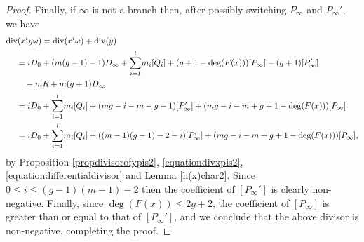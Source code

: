 \begin{proof}
    Finally, if $\infty$ is not a branch then, after possibly switching $P_\infty$ and $P_\infty'$, we have
        \begin{align*}
        \di(x^iy\omega) &  = \di (x^i\omega) + \di(y) \\
        & \hspace{-3em} = iD_0 + (m(g-1)-1)D_\infty + {\displaystyle \sum_{i=1}^l} m_i[Q_i] + (g+1-\deg(F(x)))[P_\infty] - (g+1)[P_\infty'] \\
        & \hspace{-2em} - mR + m(g+1)D_\infty \\
        & \hspace{-3em} =  iD_0 + {\displaystyle \sum_{i=1}^l} m_i[Q_i] + (mg - i - m - g - 1)[P_\infty'] + (mg - i - m + g + 1 - \deg(F(x)))[P_\infty] \\
        & \hspace{-3em} =  iD_0 + {\displaystyle \sum_{i=1}^l} m_i[Q_i] + ((m-1)(g-1) - 2 - i)[P_\infty'] + (mg - i - m + g + 1 - \deg(F(x)))[P_\infty],
        \end{align*}
    by Proposition \ref{propdivisorofypis2}, \eqref{equationdivxpis2}, \eqref{equationdifferentialdivisor} and Lemma \ref{h(x)char2}.
    Since $0 \leq i \leq (g-1)(m-1)- 2$ then the coefficient of $[P_\infty']$ is clearly non-negative.
    Finally, since $\deg(F(x)) \leq 2g+2$, the coefficient of $[P_\infty]$ is greater than or equal to that of $[P_\infty']$, and we conclude that the above divisor is non-negative, completing the proof.
    \end{proof}






















